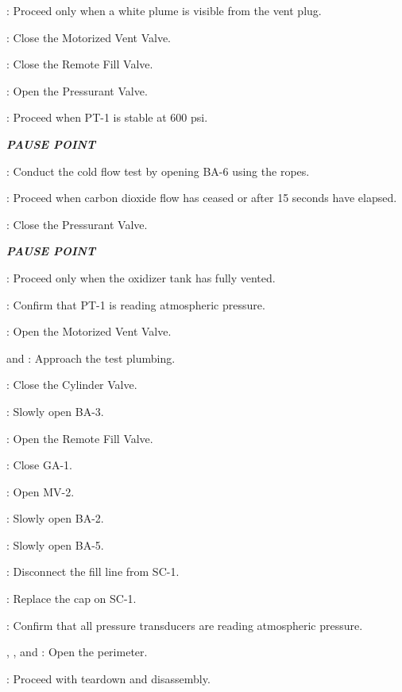 \begin{checklist}
\begin{checklist}[label=$\bullet$]
    \end{checklist}
    \item \ops{}: Proceed only when a white plume is visible from the vent plug.
    \item \control{}: Close the Motorized Vent Valve.
    \item \control{}: Close the Remote Fill Valve.
    \item \control{}: Open the Pressurant Valve.
    \item \daq{}: Proceed when PT-1 is stable at 600 psi.
    \item \textbf{\textit{PAUSE POINT}}
    \item \primary{}: Conduct the cold flow test by opening BA-6 using the ropes.
    \item \ops{}: Proceed when carbon dioxide flow has ceased or after 15 seconds have elapsed.
    \item \control{}: Close the Pressurant Valve.
    \item \textbf{\textit{PAUSE POINT}}
    \item \ops{}: Proceed only when the oxidizer tank has fully vented.
    \item \daq{}: Confirm that PT-1 is reading atmospheric pressure.
    \item \control{}: Open the Motorized Vent Valve.
    \item \primary{} and \secondary{}: Approach the test plumbing.
    \item \primary{}: Close the Cylinder Valve.
    \item \primary{}: Slowly open BA-3.
    \item \control{}: Open the Remote Fill Valve.
    \item \primary{}: Close GA-1.
    \item \control{}: Open MV-2.
    \item \primary{}: Slowly open BA-2.
    \item \primary{}: Slowly open BA-5.
    \item \primary{}: Disconnect the fill line from SC-1.
    \item \primary{}: Replace the cap on SC-1.
    \item \daq{}: Confirm that all pressure transducers are reading atmospheric pressure.
    \item \peri{}, \perii{}, and \periii{}: Open the perimeter.
    \item \ops{}: Proceed with teardown and disassembly.
\end{checklist}

